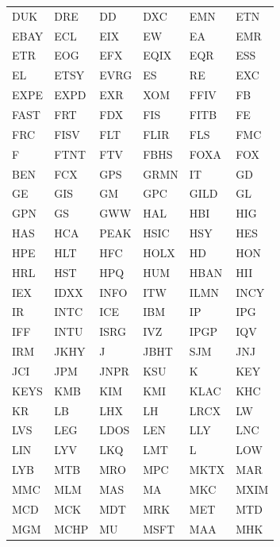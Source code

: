 \documentclass[a4paper]{article}
\begin{document}
\begin{table}[htbp]
\begin{tabular}{ |C{2cm}|C{2cm}|C{2cm}|C{2cm}|C{2cm}|C{2cm}|  }
	DUK & DRE & DD & DXC & EMN & ETN\\
	EBAY & ECL & EIX & EW & EA & EMR\\
	ETR & EOG & EFX & EQIX & EQR & ESS\\
	EL & ETSY & EVRG & ES & RE & EXC\\
	EXPE & EXPD & EXR & XOM & FFIV & FB\\
	FAST & FRT & FDX & FIS & FITB & FE\\
	FRC & FISV & FLT & FLIR & FLS & FMC\\
	F & FTNT & FTV & FBHS & FOXA & FOX\\
	BEN & FCX & GPS & GRMN & IT & GD\\
	GE & GIS & GM & GPC & GILD & GL\\
	GPN & GS & GWW & HAL & HBI & HIG\\
	HAS & HCA & PEAK & HSIC & HSY & HES\\
	HPE & HLT & HFC & HOLX & HD & HON\\
	HRL & HST & HPQ & HUM & HBAN & HII\\
	IEX & IDXX & INFO & ITW & ILMN & INCY\\
	IR & INTC & ICE & IBM & IP & IPG\\
	IFF & INTU & ISRG & IVZ & IPGP & IQV\\
	IRM & JKHY & J & JBHT & SJM & JNJ\\
	JCI & JPM & JNPR & KSU & K & KEY\\
	KEYS & KMB & KIM & KMI & KLAC & KHC\\
	KR & LB & LHX & LH & LRCX & LW\\
	LVS & LEG & LDOS & LEN & LLY & LNC\\
	LIN & LYV & LKQ & LMT & L & LOW\\
	LYB & MTB & MRO & MPC & MKTX & MAR\\
	MMC & MLM & MAS & MA & MKC & MXIM\\
	MCD & MCK & MDT & MRK & MET & MTD\\
	MGM & MCHP & MU & MSFT & MAA & MHK\\
	\hline
\end{tabular}
\end{table}
\end{document}
